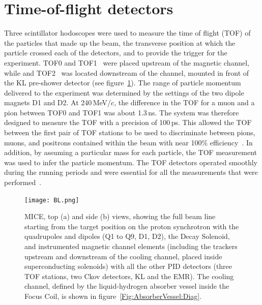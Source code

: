 \graphicspath{{02-TOF/Figures/}}

\newcommand{\Tzero}{\ensuremath{T0}}
\newcommand{\Gauss}{\ensuremath{\text{G}}}
\newcommand{\DT}{\ensuremath{\Delta T}}
\newcommand{\us}{\ensuremath{\mu\text{s}}}

\section{Time-of-flight detectors}
\label{Sect:TOF}

Three scintillator hodoscopes were used to measure the time of flight
(TOF) of the particles that made up the beam, the transverse position
at which the particle crossed each of the detectors, and to provide
the trigger for the experiment. 
TOF0 and TOF1~\cite{NOTE145,NOTE241,2010NIMPA.615...14B} were
placed upstream of the magnetic channel, while and TOF2~\cite{NOTE286}
was located downstream of the channel, mounted in front of the KL
pre-shower detector (see figure~\ref{fig:BL}).
The range of particle momentum delivered to the experiment was
determined by the settings of the two dipole magnets D1 and D2.
At 240\,MeV/$c$, the difference in the TOF for a muon and a
pion between TOF0 and TOF1 was about 1.3\,ns.
The system was therefore designed to measure the TOF with a
precision of 100\,ps. 
This allowed the TOF between the first pair of TOF stations 
to be used to discriminate between pions, muons, and positrons
contained within the beam with near 100\% efficiency~\cite{2016JInst..11P3001A}.
In addition, by assuming a particular mass for each particle, the
TOF measurement was used to infer the particle
momentum.
The TOF detectors operated smoothly during the running periods and
were essential for all the measurements that were
performed~\cite{Bogomilov:2012sr,Adams:2013lba,2015JInst..10P2012A,2016JInst..11P3001A,Adams:2018qhj,Bogomilov:2019kfj}.
\begin{figure}
  \begin{center}
    \texttt{[image: BL.png]}
    \caption{
      MICE, top (a) and side (b) views, showing the full beam line
      starting from the target position on the proton synchrotron with the quadrupoles and dipoles (Q1 to Q9, D1, D2), the
      Decay Solenoid, and instrumented magnetic channel elements
      (including the trackers upstream and downstream of the cooling
      channel, placed inside superconducting solenoids) with all the
      other PID detectors (three TOF stations, two Ckov detectors, KL and
      the EMR).
      The cooling channel, defined by the liquid-hydrogen absorber
      vessel inside the Focus Coil, is shown in
      figure~\ref{Fig:AbsorberVessel:Diag}.
    }
    \label{fig:BL}
  \end{center}
\end{figure}

